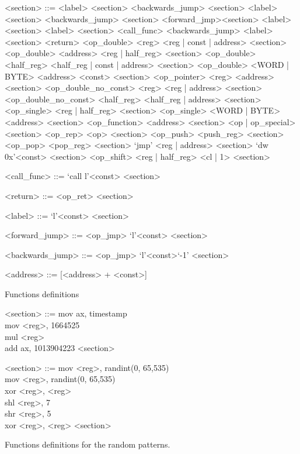 \documentclass[dvipsnames, format=sigconf]{acmart}
\begin{document}
\begin{BNF}
\begin{framed}
\begin{grammar}
<section> ::= <label> <section> <backwards\_jump> <section>
\alt <label> <section> <backwards\_jump>
\alt <section> <forward\_jmp><section> <label> <section>
\alt <label> <section> <call\_func> <backwards\_jump> <label> <section> <return>
\alt <op\_double> <reg>  <reg | const | address> <section>
\alt <op\_double> <address> <reg | half\_reg> <section>
\alt <op\_double> <half\_reg> <half\_reg | const | address> <section>
\alt <op\_double> <WORD | BYTE> <address> <const> <section>
\alt <op\_pointer> <reg> <address> <section>
\alt <op\_double\_no\_const> <reg> <reg | address> <section>
\alt <op\_double\_no\_const> <half\_reg> <half\_reg | address> <section>
\alt <op\_single> <reg | half\_reg> <section>
\alt <op\_single> <WORD | BYTE> <address> <section>
\alt <op\_function> <address> <section>
\alt <op | op\_special> <section>
\alt <op\_rep> <op> <section>
\alt <op\_push> <push\_reg> <section>
\alt <op\_pop> <pop\_reg> <section>
\alt `jmp' <reg | address> <section>
\alt `dw 0x'<const> <section>
\alt <op\_shift> <reg | half\_reg> <cl | 1> <section>

<call\_func> ::= `call l'<const> <section>

<return> ::= <op\_ret> <section>

<label> ::= `l'<const> <section>

<forward\_jump> ::= <op\_jmp> `l'<const> <section>

<backwards\_jump> ::= <op\_jmp> `l'<const>`-1' <section>

<address> ::= [<address> + <const>] 
\end{grammar}
\end{framed}\vspace{-1em}
\caption{Functions definitions}\vspace{2em}
\label{tab:t2_function_set}
\end{BNF}

\begin{BNF}
\setlength{\grammarindent}{6em}
\begin{framed}
\begin{grammar}
<section> ::= mov ax, timestamp\\
mov <reg>, 1664525\\
mul <reg>\\
add ax, 1013904223 <section>

<section> ::= mov <reg>, randint(0, 65,535)\\
mov <reg>, randint(0, 65,535)\\
xor <reg>, <reg>\\
shl <reg>, 7\\
shr <reg>, 5\\
xor <reg>, <reg> <section>
\end{grammar}
\end{framed}\vspace{-1em}
\setlength{\grammarindent}{2em}
\caption{Functions definitions for the random patterns.}\vspace{2em}
\label{table3_random_set}
\end{BNF}
\end{document}
